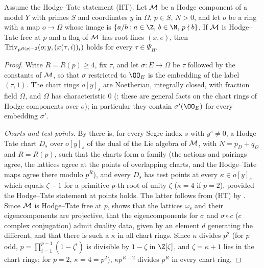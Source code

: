 \begin{proposition}\label{pf:towergeo:htcharts}
Assume the Hodge--Tate statement \textup{(HT)}. Let $\mathcal M$ be a Hodge component of a model $Y$ with
primes $S$ and coordinates $y$ in $\Omega$, $p\in S$, $N>0$, and let $o$ be a ring with a map
$o\to\Omega$ whose image is $\{a/b:a\in\Z,\,b\in\N,\,p\nmid b\}$. If $\mathcal M$ is Hodge--Tate free at
$p$ and a flag of $\mathcal M$ has root lines $(x,e)$, then $\mathrm{Triv}_{p^{R(p)-2}}(o;y,(x(\tau,i))_i)$
holds for every $\tau\in\Psi_H$.
\end{proposition}

\begin{proof}
Write $R=R(p)\ge4$, fix $\tau$, and let $\sigma\colon E\to\Omega$ be $\tau$ followed by the constants of
$\mathcal M$, so that $\sigma$ restricted to $\OO_E$ is the embedding of the label $(\tau,1)$. The chart rings
$o[y]_s$ are Noetherian, integrally closed, with fraction field $\Omega$, and $\Omega$ has characteristic $0$
(: these are general facts on the chart rings of
Hodge components over $o$); in particular they contain $\sigma'(\OO_E)$ for every embedding $\sigma'$.

\emph{Charts and test points.} By  there is, for
every Segre index $s$ with $y^s\ne0$, a Hodge--Tate chart $D_s$ over $o[y]_s$ of the dual of the Lie algebra of
$\mathcal M$, with $N=p_D+q_D$ and $R=R(p)$, such that the charts form a family (the actions and pairings agree,
the lattices agree at the points of overlapping charts, and the Hodge--Tate maps agree there modulo $p^R$), and
every $D_s$ has test points at every $\kappa\in o[y]_s$ which equals $\zeta-1$ for a primitive $p$-th root of
unity $\zeta$ ($\kappa=4$ if $p=2$), provided the Hodge--Tate statement at points holds. The latter follows from
(HT) by . Since $\mathcal M$ is Hodge--Tate free at $p$,
 shows that the lattices $\omega_s$ and their eigencomponents
are projective, that the eigencomponents for $\sigma$ and $\sigma\circ c$ ($c$ complex conjugation) admit duality
data, given by an element $d$ generating the different, and that there is such a $\kappa$ in all chart rings.
Since $\kappa$ divides $p^2$ (for $p$ odd, $p=\prod_{i=1}^{p-1}(1-\zeta^i)$ is divisible by $1-\zeta$ in $\Z[\zeta]$, and
$\zeta=\kappa+1$ lies in the chart rings; for $p=2$, $\kappa=4=p^2$), $\kappa p^{R-2}$ divides $p^R$ in every chart ring.


\end{proof}
